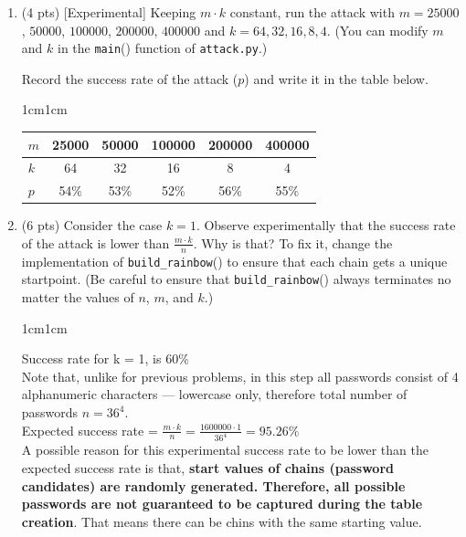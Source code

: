 \documentclass[11pt,letterpaper]{article}
\newenvironment{answer}{\em \color{blue} \begin{adjustwidth}{1cm}{1cm}}{\end{adjustwidth}}
\begin{document}
\begin{enumerate}
\begin{answer}
		\end{answer}
		
		\item (4 pts) [Experimental] Keeping $m \cdot k$ constant, run the attack with $m = 25000$, $50000$, $100000$, $200000$, $400000$ and $k = 64, 32, 16, 8, 4$. (You can modify $m$ and $k$ in the \texttt{main}() function of \texttt{attack.py}.) 
		
		Record the success rate of the attack ($p$) and write it in the table below.
		
		\begin{answer}
			
			\begin{center}
				\begin{tabular}{|l|c|c|c|c|c|}
					\hline
					$m$ & 25000 & 50000 & 100000 & 200000 & 400000 \\ \hline
					$k$ & 64 & 32    & 16      & 8      & 4      \\ \hline \hline
					$p$ & 54\% & 53\%  &  52\%  & 56\%  &  55\%   \\ \hline
				\end{tabular}	
			\end{center}	
			
		\end{answer}
		
		\item (6 pts) Consider the case $k=1$. Observe experimentally that the success rate of the attack is lower than $\frac{m \cdot k}{n}$. Why is that?  To fix it, change the implementation of \texttt{build\_rainbow}() to ensure that each chain gets a unique startpoint. (Be careful to ensure that \texttt{build\_rainbow}() always terminates no matter the values of $n$, $m$, and $k$.)
		
		\begin{answer}
			
			Success rate for k = 1, is 60\%\\
			
			Note that, unlike for previous problems, in this step all passwords consist of 4 alphanumeric characters --- lowercase only, therefore total number of passwords $n = 36^4$.\\
			
			Expected success rate = $\frac{m \cdot k}{n} = \frac{1600000 \cdot 1}{36^4} = 95.26\% $\\
			
			A possible reason for this experimental success rate to be lower than the expected success rate is that, \textbf{start values of chains (password candidates) are randomly generated. Therefore, all possible passwords are not guaranteed to be captured during the table creation}. That means there can be chins with the same starting value.
			

\end{answer}
\end{enumerate}
\end{document}
